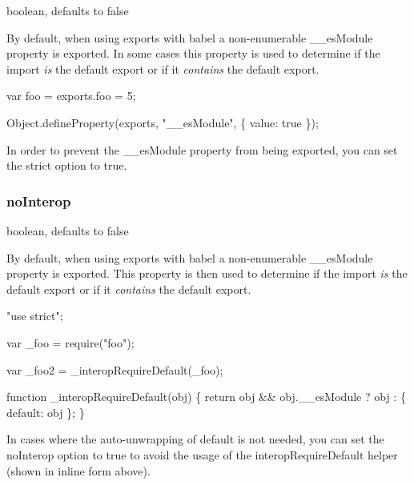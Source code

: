 {\ttfamily boolean}, defaults to {\ttfamily false}

By default, when using exports with babel a non-\/enumerable {\ttfamily \+\_\+\+\_\+es\+Module} property is exported. In some cases this property is used to determine if the import {\itshape is} the default export or if it {\itshape contains} the default export.


\begin{DoxyCode}
var foo = exports.foo = 5;

Object.defineProperty(exports, "\_\_esModule", \{
  value: true
\});
\end{DoxyCode}


In order to prevent the {\ttfamily \+\_\+\+\_\+es\+Module} property from being exported, you can set the {\ttfamily strict} option to {\ttfamily true}.

\subsubsection*{{\ttfamily no\+Interop}}

{\ttfamily boolean}, defaults to {\ttfamily false}

By default, when using exports with babel a non-\/enumerable {\ttfamily \+\_\+\+\_\+es\+Module} property is exported. This property is then used to determine if the import {\itshape is} the default export or if it {\itshape contains} the default export.


\begin{DoxyCode}
"use strict";

var \_foo = require("foo");

var \_foo2 = \_interopRequireDefault(\_foo);

function \_interopRequireDefault(obj) \{
  return obj && obj.\_\_esModule ? obj : \{ default: obj \};
\}
\end{DoxyCode}


In cases where the auto-\/unwrapping of {\ttfamily default} is not needed, you can set the {\ttfamily no\+Interop} option to {\ttfamily true} to avoid the usage of the {\ttfamily interop\+Require\+Default} helper (shown in inline form above). 